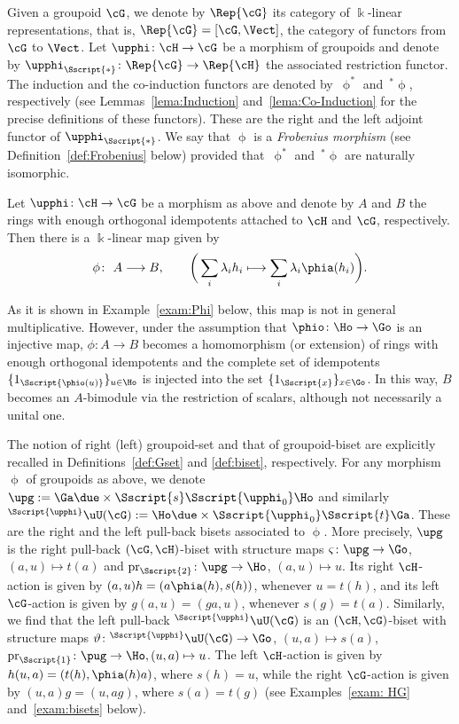 Given a groupoid $\cG$, we denote by $\Rep{\cG}$ its category of $\Bbbk$-linear representations, that is, $\Rep{\cG}=[\cG, \Vect]$, the category of functors from $\cG$ to $\Vect$. Let $\upphi \colon \cH \to \cG$ be a morphism of groupoids and denote by $\upphi_{\Sscript{*}}\colon \Rep{\cG} \to \Rep{\cH}$ the associated restriction functor. The induction and the co-induction functors are denoted by~$\upphi^{*}$ and~${}^{*}\upphi$, respectively (see Lemmas~\ref{lema:Induction} and~\ref{lema:Co-Induction} for the precise definitions of these functors). These are the right and the left adjoint functor of $\upphi_{\Sscript{*}}$. We say that $\upphi$ is a \emph{Frobenius morphism} (see Definition~\ref{def:Frobenius} below) provided that~$\upphi^{*}$ and~${}^{*}\upphi$ are naturally isomorphic.

 Let $\upphi\colon \cH \to \cG$ be a morphism as above and denote by $A$ and $B$ the rings with enough orthogonal idempotents attached to $\cH$ and $\cG$, respectively. Then there is a $\Bbbk$-linear map given by
\begin{gather}\label{Eq:phi}
\phi\colon \ A \longrightarrow B, \qquad \bigg( \sum_i \lambda_i h_i \longmapsto \sum_i \lambda_i \phia(h_i)\bigg).
\end{gather}

As it is shown in Example~\ref{exam:Phi} below, this map is not in general multiplicative. However, under the assumption that $\phio\colon \Ho \to \Go$ is an injective map, $\phi\colon A \to B$ becomes a homomorphism (or extension) of rings with enough orthogonal idempotents and the complete set of idempotents $\{1_{\Sscript{\phio(u)}}\}_{u \in \Ho}$ is injected into the set $\{1_{\Sscript{x}}\}_{x \in \Go}$. In this way, $B$ becomes an $A$-bimodule via the restriction of scalars, although not necessarily a unital one.

The notion of right (left) groupoid-set and that of groupoid-biset are explicitly recalled in Definitions~\ref{def:Gset} and \ref{def:biset}, respectively. For any morphism $\upphi$ of groupoids as above, we denote $\upg:=\Ga \due \times {\Sscript{s}}{ \Sscript{\upphi_0} } \Ho$ and similarly ${ }^{\Sscript{\upphi}}\uU(\cG):=\Ho \due \times{\Sscript{\upphi_0}}{ \Sscript{t}} \Ga$. These are the right and the left pull-back bisets associated to $\upphi$. More precisely, $\upg$ is the right pull-back $(\cG,\cH)$-biset with structure maps $\varsigma\colon \upg \to \Go$, $(a,u) \mapsto t(a)$ and ${\rm pr}_{\Sscript{2}}\colon \upg \to \Ho$, $(a,u) \mapsto u$. Its right $\cH$-action is given by $(a,u) h= (a\phia(h), s(h))$, whenever $u=t(h)$, and its left $\cG$-action is given by $g(a,u)=(ga,u)$, whenever $s(g)=t(a)$. Similarly, we find that the left pull-back ${ }^{\Sscript{\upphi}}\uU(\cG)$ is an $(\cH,\cG)$-biset with structure maps $\vartheta\colon {}^{\Sscript{\upphi}}\uU(\cG) \to \Go$, $(u,a) \mapsto s(a)$, ${\rm pr}_{\Sscript{1}}\colon \pug \to \Ho, (u,a) \mapsto u$. The left $\cH$-action is given by $h (u,a)=(t(h), \phia(h)a)$, where $s(h)=u$, while the right $\cG$-action is given by $(u,a) g=(u,ag)$, where $s(a)=t(g)$ (see Examples~\ref{exam: HG} and~\ref{exam:bisets} below).

